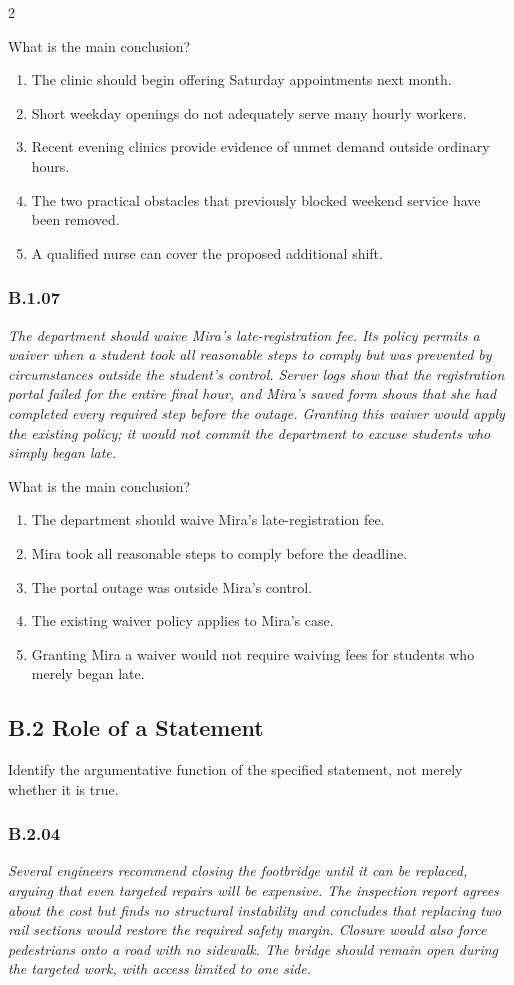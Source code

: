 \documentclass[10pt]{extarticle}
\newcommand{\choice}[1]{\item #1}
\newcommand{\bankitem}[1]{\subsubsection*{#1}}
\begin{document}
\begin{multicols}{2}
\begin{samepage}
What is the main conclusion?
\begin{enumerate}[label=(\alph*)]
  \choice{The clinic should begin offering Saturday appointments next month.}
  \choice{Short weekday openings do not adequately serve many hourly workers.}
  \choice{Recent evening clinics provide evidence of unmet demand outside ordinary hours.}
  \choice{The two practical obstacles that previously blocked weekend service have been removed.}
  \choice{A qualified nurse can cover the proposed additional shift.}
\end{enumerate}
\end{samepage}\par\smallskip
\begin{samepage}
\bankitem{B.1.07}
\emph{The department should waive Mira's late-registration fee. Its policy permits a waiver when a student took all reasonable steps to comply but was prevented by circumstances outside the student's control. Server logs show that the registration portal failed for the entire final hour, and Mira's saved form shows that she had completed every required step before the outage. Granting this waiver would apply the existing policy; it would not commit the department to excuse students who simply began late.}

What is the main conclusion?
\begin{enumerate}[label=(\alph*)]
  \choice{The department should waive Mira's late-registration fee.}
  \choice{Mira took all reasonable steps to comply before the deadline.}
  \choice{The portal outage was outside Mira's control.}
  \choice{The existing waiver policy applies to Mira's case.}
  \choice{Granting Mira a waiver would not require waiving fees for students who merely began late.}
\end{enumerate}
\end{samepage}\par\smallskip
\subsection*{B.2 Role of a Statement}
Identify the argumentative function of the specified statement, not merely whether it is true.
\begin{samepage}
\bankitem{B.2.04}
\emph{Several engineers recommend closing the footbridge until it can be replaced, arguing that even targeted repairs will be expensive. The inspection report agrees about the cost but finds no structural instability and concludes that replacing two rail sections would restore the required safety margin. Closure would also force pedestrians onto a road with no sidewalk. The bridge should remain open during the targeted work, with access limited to one side.}


\end{samepage}
\end{multicols}
\end{document}

